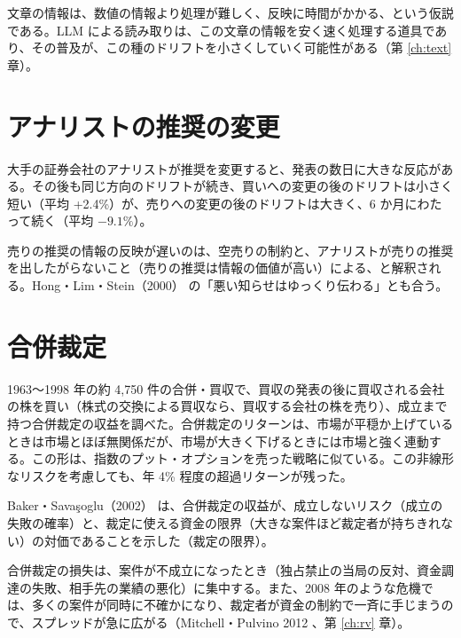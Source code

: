 文章の情報は、数値の情報より処理が難しく、反映に時間がかかる、という仮説である。LLM による読み取りは、この文章の情報を安く速く処理する道具であり、その普及が、この種のドリフトを小さくしていく可能性がある（第 \ref{ch:text} 章）。

\section{アナリストの推奨の変更}

\begin{paperbox}
大手の証券会社のアナリストが推奨を変更すると、発表の数日に大きな反応がある。その後も同じ方向のドリフトが続き、買いへの変更の後のドリフトは小さく短い（平均 +2.4\%）が、売りへの変更の後のドリフトは大きく、6 か月にわたって続く（平均 $-9.1\%$）。
\end{paperbox}

売りの推奨の情報の反映が遅いのは、空売りの制約と、アナリストが売りの推奨を出したがらないこと（売りの推奨は情報の価値が高い）による、と解釈される。Hong・Lim・Stein（2000）\cite{hls2000} の「悪い知らせはゆっくり伝わる」とも合う。

\section{合併裁定}

\begin{paperbox}
1963〜1998 年の約 4,750 件の合併・買収で、買収の発表の後に買収される会社の株を買い（株式の交換による買収なら、買収する会社の株を売り）、成立まで持つ合併裁定の収益を調べた。合併裁定のリターンは、市場が平穏か上げているときは市場とほぼ無関係だが、市場が大きく下げるときには市場と強く連動する。この形は、指数のプット・オプションを売った戦略に似ている。この非線形なリスクを考慮しても、年 4\% 程度の超過リターンが残った。
\end{paperbox}

Baker・Savaşoglu（2002）\cite{bakersavasoglu2002} は、合併裁定の収益が、成立しないリスク（成立の失敗の確率）と、裁定に使える資金の限界（大きな案件ほど裁定者が持ちきれない）の対価であることを示した（裁定の限界）。

合併裁定の損失は、案件が不成立になったとき（独占禁止の当局の反対、資金調達の失敗、相手先の業績の悪化）に集中する。また、2008 年のような危機では、多くの案件が同時に不確かになり、裁定者が資金の制約で一斉に手じまうので、スプレッドが急に広がる（Mitchell・Pulvino 2012 \cite{mitchellpulvino2012}、第 \ref{ch:rv} 章）。

